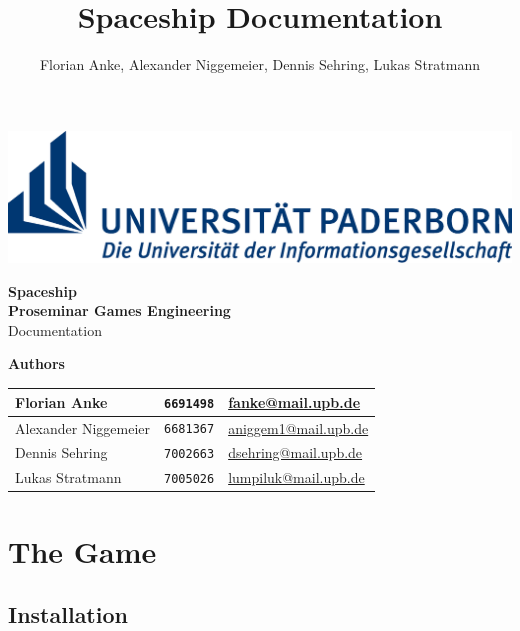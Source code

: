 \documentclass[11pt,a4paper]{article}
\author{Florian Anke, Alexander Niggemeier, Dennis Sehring, Lukas Stratmann}
\title{Spaceship Documentation}
\begin{document}
	\begin{titlepage}
		\begin{center}
			\includegraphics[width=.7\textwidth]{Logo_Uni_Paderborn}
			
			\vspace{2cm}			
			
			\LARGE{\textbf{Spaceship}} \\
            \vspace{.3cm}
            \Large{\textbf{Proseminar Games Engineering}} \\
			\vspace{.7cm}
			\LARGE{Documentation} \\
			
			\vspace{4cm}
			
			\Large{\textbf{Authors}} \\
			\medskip
			
			\begin{tabular}{|l|l|l|} \hline
            	Florian Anke		& \texttt{6691498}			& \href{mailto:fanke@mail.upb.de}{fanke@mail.upb.de} \\ \hline
                Alexander Niggemeier	& \texttt{6681367}		& \href{mailto:aniggem1@mail.upb.de}{aniggem1@mail.upb.de} \\ \hline
				Dennis Sehring		& \texttt{7002663} 	& \href{mailto:dsehring@mail.upb.de}{dsehring@mail.upb.de} \\ \hline
				Lukas Stratmann		& \texttt{7005026} 	& \href{mailto:lumpiluk@mail.upb.de}{lumpiluk@mail.upb.de} \\ \hline
			\end{tabular}
		\end{center}
	\end{titlepage}
	
	\newpage
	
    \tableofcontents
    \newpage
    
    \section{The Game}
    
    	\subsection{Installation}
        
\end{document}
